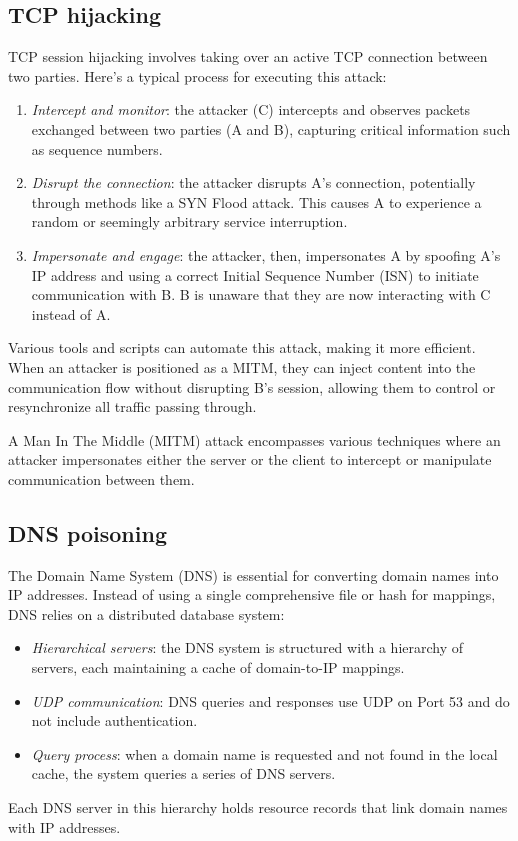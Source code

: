 \subsection{TCP hijacking}
TCP session hijacking involves taking over an active TCP connection between two parties. 
Here's a typical process for executing this attack:
\begin{enumerate}
    \item \textit{Intercept and monitor}: the attacker (C) intercepts and observes packets exchanged between two parties (A and B), capturing critical information such as sequence numbers.
    \item \textit{Disrupt the connection}: the attacker disrupts A's connection, potentially through methods like a SYN Flood attack. 
        This causes A to experience a random or seemingly arbitrary service interruption.
    \item \textit{Impersonate and engage}: the attacker, then, impersonates A by spoofing A's IP address and using a correct Initial Sequence Number (ISN) to initiate communication with B. 
        B is unaware that they are now interacting with C instead of A.
\end{enumerate}
Various tools and scripts can automate this attack, making it more efficient. 
When an attacker is positioned as a MITM, they can inject content into the communication flow without disrupting B's session, allowing them to control or resynchronize all traffic passing through.
\begin{definition}
    A Man In The Middle (MITM) attack encompasses various techniques where an attacker impersonates either the server or the client to intercept or manipulate communication between them.
\end{definition}

\subsection{DNS poisoning}
The Domain Name System (DNS) is essential for converting domain names into IP addresses. 
Instead of using a single comprehensive file or hash for mappings, DNS relies on a distributed database system:
\begin{itemize}
    \item \textit{Hierarchical servers}: the DNS system is structured with a hierarchy of servers, each maintaining a cache of domain-to-IP mappings.
    \item \textit{UDP communication}: DNS queries and responses use UDP on Port 53 and do not include authentication.
    \item \textit{Query process}: when a domain name is requested and not found in the local cache, the system queries a series of DNS servers.
\end{itemize}
Each DNS server in this hierarchy holds resource records that link domain names with IP addresses.

